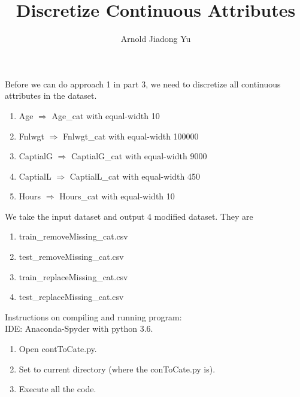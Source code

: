 \documentclass[12pt]{article}
\begin{document}
\title{Discretize Continuous Attributes}
\author{Arnold Jiadong Yu}
\maketitle


Before we can do approach 1 in part 3, we need to discretize all continuous attributes in the dataset.
\begin{enumerate}
\item Age $\Rightarrow$ Age\_cat with equal-width 10
\item Fnlwgt $\Rightarrow$ Fnlwgt\_cat with equal-width 100000
\item CaptialG $\Rightarrow$ CaptialG\_cat with equal-width 9000
\item CaptialL $\Rightarrow$ CaptialL\_cat with equal-width 450
\item Hours $\Rightarrow$ Hours\_cat with equal-width 10
\end{enumerate}

We take the input dataset and output 4 modified dataset. They are
\begin{enumerate}
\item train\_removeMissing\_cat.csv
\item test\_removeMissing\_cat.csv
\item train\_replaceMissing\_cat.csv
\item test\_replaceMissing\_cat.csv
\end{enumerate}

Instructions on compiling and running program:\\

IDE: Anaconda-Spyder with python 3.6.\\
\begin{enumerate}
\item Open contToCate.py.
\item Set to current directory (where the conToCate.py is).
\item Execute all the code.

\end{enumerate}
\end{document}
